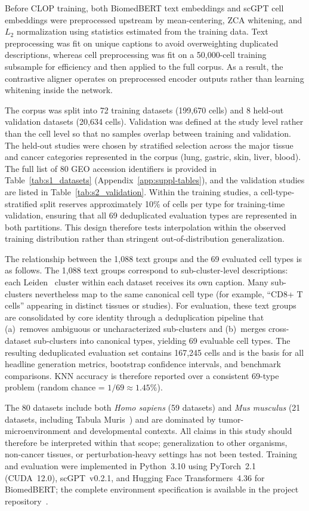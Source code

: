 \documentclass[11pt,a4paper]{article}
\begin{document}
Before CLOP training, both BiomedBERT text embeddings and scGPT cell embeddings were preprocessed upstream by mean-centering, ZCA whitening, and $L_2$ normalization using statistics estimated from the training data. Text preprocessing was fit on unique captions to avoid overweighting duplicated descriptions, whereas cell preprocessing was fit on a 50,000-cell training subsample for efficiency and then applied to the full corpus. As a result, the contrastive aligner operates on preprocessed encoder outputs rather than learning whitening inside the network.

The corpus was split into 72 training datasets (199,670 cells) and 8 held-out validation datasets (20,634 cells). Validation was defined at the study level rather than the cell level so that no samples overlap between training and validation. The held-out studies were chosen by stratified selection across the major tissue and cancer categories represented in the corpus (lung, gastric, skin, liver, blood). The full list of 80 GEO accession identifiers is provided in Table~\ref{tab:s1_datasets} (Appendix~\ref{app:suppl-tables}), and the validation studies are listed in Table~\ref{tab:s2_validation}. Within the training studies, a cell-type-stratified split reserves approximately 10\% of cells per type for training-time validation, ensuring that all 69 deduplicated evaluation types are represented in both partitions. This design therefore tests interpolation within the observed training distribution rather than stringent out-of-distribution generalization.

The relationship between the 1,088 text groups and the 69 evaluated cell types is as follows. The 1,088 text groups correspond to sub-cluster-level descriptions: each Leiden~\cite{ref-leiden} cluster within each dataset receives its own caption. Many sub-clusters nevertheless map to the same canonical cell type (for example, ``CD8+ T cells'' appearing in distinct tissues or studies). For evaluation, these text groups are consolidated by core identity through a deduplication pipeline that (a)~removes ambiguous or uncharacterized sub-clusters and (b)~merges cross-dataset sub-clusters into canonical types, yielding 69 evaluable cell types. The resulting deduplicated evaluation set contains 167,245 cells and is the basis for all headline generation metrics, bootstrap confidence intervals, and benchmark comparisons. KNN accuracy is therefore reported over a consistent 69-type problem (random chance = $1/69 \approx 1.45\%$).

The 80 datasets include both \textit{Homo sapiens} (59 datasets) and \textit{Mus musculus} (21 datasets, including Tabula Muris~\cite{ref-tabula-muris}) and are dominated by tumor-microenvironment and developmental contexts. All claims in this study should therefore be interpreted within that scope; generalization to other organisms, non-cancer tissues, or perturbation-heavy settings has not been tested. Training and evaluation were implemented in Python~3.10 using PyTorch~2.1 (CUDA~12.0), scGPT~v0.2.1, and Hugging Face Transformers~4.36 for BiomedBERT; the complete environment specification is available in the project repository~\cite{ref-clop-dit}.
\end{document}

